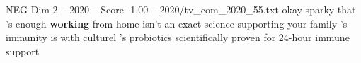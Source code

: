 \begin{textsample}{NEG Dim 2 – 2020 – Score -1.00 – 2020/tv\_com\_2020\_55.txt}  \label{ex:f2_neg_039}
okay sparky that 's enough \textbf{working} from home isn't an exact science supporting your family 's immunity is with culturel 's probiotics scientifically proven for 24-hour immune support

\end{textsample}
